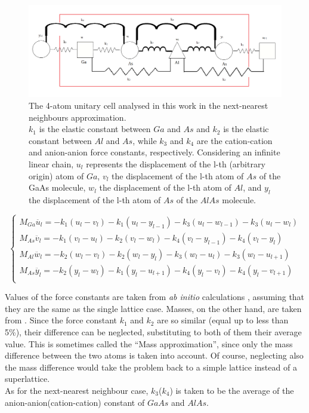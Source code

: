 \documentclass{article}
\begin{document}
\begin{figure}
	\centering
	\includegraphics[width=0.7\linewidth]{cella2.png}
	\caption{The 4-atom unitary cell analysed in this work in the next-nearest neighbours approximation.\\
	$k_1$ is the elastic constant between $Ga$ and $As$ and $k_2$ is the elastic constant between $Al$ and $As$, while $k_3$ and $k_4$ are the cation-cation and anion-anion force constants, respectively. Considering an infinite linear chain, $u_l$ represents the displacement of the l-th (arbitrary origin) atom of $Ga$, $v_l$ the displacement of the l-th atom of $As$ of the GaAs molecule, $w_l$ the displacement of the l-th atom of $Al$, and $y_l$ the displacement of the l-th atom of $As$ of the $AlAs$ molecule.   }
	\label{fig:cella2}
\end{figure}
\begin{equation}
	\begin{cases}
		M_{Ga}\ddot{u_l} = -k_1(u_l-v_l) - k_1(u_l-y_{l-1}) - k_3(u_l -w_{l-1}) - k_3(u_l - w_{l})	 \\
		M_{As}\ddot{v_l} = -k_1(v_l-u_l) - k_2(v_l-w_l)	- k_4(v_l -y_{l-1}) - k_4(v_l - y_{l})	 	 \\
		M_{Al}\ddot{w_l} = -k_2(w_l-v_l) - k_2(w_l-y_l)	- k_3(w_l - u_l) - k_3(w_l - u_{l+1})	 	 \\
		M_{As}\ddot{y_l} = -k_2(y_l-w_l) - k_1(y_l-u_{l+1})- k_4(y_l -v_l) - k_4(y_l - v_{l+1})	  \\
	\end{cases}
	\label{eq:sistema}	
\end{equation}

Values of the force constants are taken from \emph{ab initio} calculations \cite[Table 2]{Molinari}, assuming that they are the same as the single lattice case. Masses, on the other hand, are taken from \cite{IUPAC}.
Since the force constant $k_1$ and $k_2$ are so similar (equal up to less than 5\%), their difference can be neglected, substituting to both of them their average value. This is sometimes called the “Mass approximation”, since only the mass difference between the two atoms is taken into account. Of course, neglecting also the mass difference would take the problem back to a simple lattice instead of a superlattice.\\
As for the next-nearest neighbour case, $k_3$($k_4$) is taken to be the average of the anion-anion(cation-cation) constant of $GaAs$ and $AlAs$.
\end{document}
